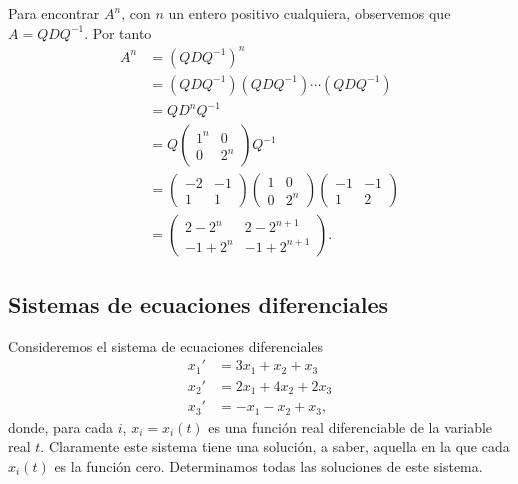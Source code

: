 \documentclass[12pt,a4paper]{book}
\begin{document}
\begin{ejemplo}
        Para encontrar $A^n$, con $n$ un entero positivo cualquiera, observemos que $A=QDQ^{-1}$. Por tanto
        \begin{align*}
            A^n&=(QDQ^{-1})^n\\
            &=(QDQ^{-1})(QDQ^{-1})\cdots(QDQ^{-1})\\
            &=QD^nQ^{-1}\\
            &=Q\begin{pmatrix}1^n&0\\0&2^n\end{pmatrix}Q^{-1}\\
            &=\begin{pmatrix}-2&-1\\1&1\end{pmatrix}\begin{pmatrix}1&0\\0&2^n\end{pmatrix}\begin{pmatrix}-1&-1\\1&2\end{pmatrix}\\
            &=\begin{pmatrix}2-2^n&2-2^{n+1}\\-1+2^n&-1+2^{n+1}\end{pmatrix}.
        \end{align*}
    \end{ejemplo}

    \subsection*{Sistemas de ecuaciones diferenciales}

    Consideremos el sistema de ecuaciones diferenciales
    \begin{align*}
        x_1'&=3x_1+x_2+x_3\\
        x_2'&=2x_1+4x_2+2x_3\\
        x_3'&=-x_1-x_2+x_3,
    \end{align*}
    donde, para cada $i$, $x_i=x_i(t)$ es una función real diferenciable de la variable real $t$. Claramente este sistema tiene una solución, a saber, aquella en la que cada $x_i(t)$ es la función cero. Determinamos todas las soluciones de este sistema.
\end{document}
